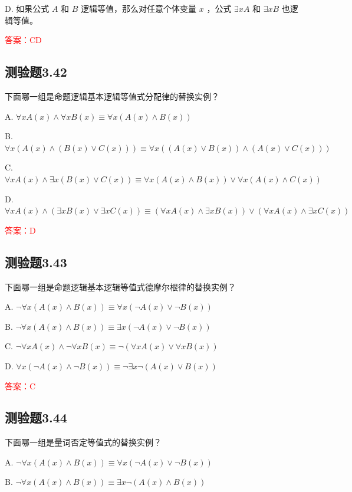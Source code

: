 \documentclass[UTF8, heading=true]{ctexart}
\begin{document}
D. 
如果公式 $A$ 和 $B$ 逻辑等值，那么对任意个体变量 $x$ ，公式 $\exists x A$ 和 $\exists x B$ 也逻辑等值。


\textcolor{red}{答案：CD}

\subsection{测验题3.42}

下面哪一组是命题逻辑基本逻辑等值式分配律的替换实例？

A. $\forall x A(x) \wedge \forall x B(x) \equiv \forall x(A(x) \wedge B(x))$

B. $\forall x(A(x) \wedge(B(x) \vee C(x))) \equiv \forall x((A(x) \vee B(x)) \wedge(A(x) \vee C(x)))$

C. $\forall x A(x) \wedge \exists x(B(x) \vee C(x)) \equiv \forall x(A(x) \wedge B(x)) \vee \forall x(A(x) \wedge C(x))$

D. $\forall x A(x) \wedge(\exists x B(x) \vee \exists x C(x)) \equiv(\forall x A(x) \wedge \exists x B(x)) \vee(\forall x A(x) \wedge \exists x C(x))$

\textcolor{red}{答案：D}

\subsection{测验题3.43}

下面哪一组是命题逻辑基本逻辑等值式德摩尔根律的替换实例？

A. $ \neg \forall x(A(x) \wedge B(x)) \equiv \forall x(\neg A(x) \vee \neg B(x))$

B. $\neg \forall x(A(x) \wedge B(x)) \equiv \exists x(\neg A(x) \vee \neg B(x))$

C. $\neg \forall x A(x) \wedge \neg \forall x B(x) \equiv \neg(\forall x A(x) \vee \forall x B(x))$

D. $\forall x(\neg A(x) \wedge \neg B(x)) \equiv \neg \exists x \neg(A(x) \vee B(x))$

\textcolor{red}{答案：C}

\subsection{测验题3.44}

下面哪一组是量词否定等值式的替换实例？

A. $\neg \forall x(A(x) \wedge B(x)) \equiv \forall x(\neg A(x) \vee \neg B(x))$

B. $\neg \forall x(A(x) \wedge B(x)) \equiv \exists x \neg(A(x) \wedge B(x))$
\end{document}
